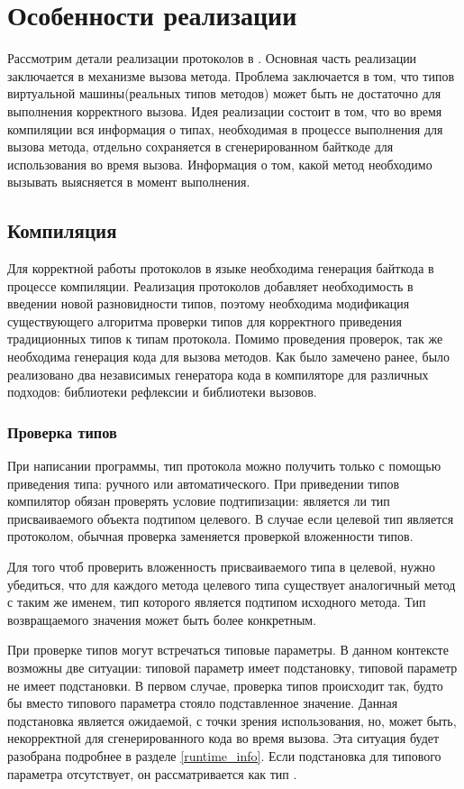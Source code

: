 \section{Особенности реализации}
Рассмотрим детали реализации протоколов в . Основная часть реализации заключается в механизме вызова метода. Проблема заключается в том, что типов виртуальной машины(реальных типов методов) может быть не достаточно для выполнения корректного вызова. Идея реализации состоит в том, что во время компиляции вся информация о типах, необходимая в процессе выполнения для вызова метода, отдельно сохраняется в сгенерированном байткоде для использования во время вызова. Информация о том, какой метод необходимо вызывать выясняется в момент выполнения.

\subsection{Компиляция}
Для корректной работы протоколов в языке необходима генерация байткода в процессе компиляции. Реализация протоколов добавляет необходимость в введении новой разновидности типов, поэтому необходима модификация существующего алгоритма проверки типов для корректного приведения традиционных типов к типам протокола. Помимо проведения проверок, так же необходима генерация кода для вызова методов. Как было замечено ранее, было реализовано два независимых генератора кода в компиляторе для различных подходов: библиотеки рефлексии и библиотеки вызовов.

\subsubsection{Проверка типов} При написании программы, тип протокола можно получить только с помощью приведения типа: ручного или автоматического. При приведении типов компилятор обязан проверять условие подтипизации: является ли тип присваиваемого объекта подтипом целевого. В случае если целевой тип является протоколом, обычная проверка заменяется проверкой вложенности типов.

Для того чтоб проверить вложенность присваиваемого типа в целевой, нужно убедиться, что для каждого метода целевого типа существует аналогичный метод с таким же именем, тип которого является подтипом исходного метода. Тип возвращаемого значения может быть более конкретным.

При проверке типов могут встречаться типовые параметры. В данном контексте возможны две ситуации: типовой параметр имеет подстановку, типовой параметр не имеет подстановки. В первом случае, проверка типов происходит так, будто бы вместо типового параметра стояло подставленное значение. Данная подстановка является ожидаемой, с точки зрения использования, но, может быть, некорректной для сгенерированного кода во время вызова. Эта ситуация будет разобрана подробнее в разделе \ref{runtime_info}. Если подстановка для типового параметра отсутствует, он рассматривается как тип .

